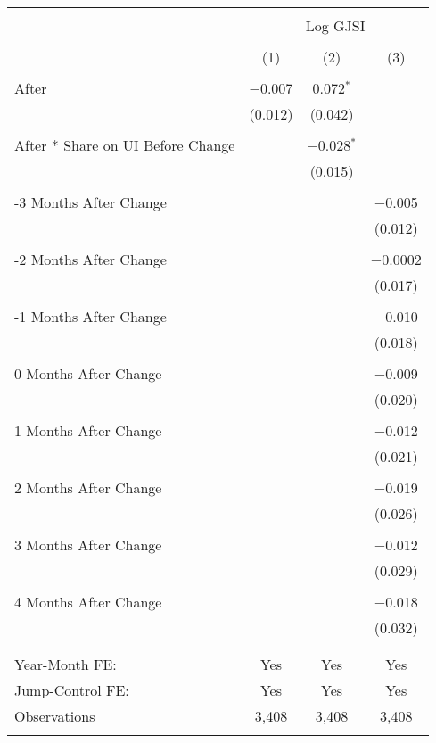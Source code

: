 
\begin{tabular}{@{\extracolsep{5pt}}lccc} 
\\[-1.8ex]\hline 
\hline \\[-1.8ex] 
 & \multicolumn{3}{c}{Log GJSI} \\ 
\cline{2-4} 
\\[-1.8ex] & (1) & (2) & (3)\\ 
\hline \\[-1.8ex] 
 After & $-$0.007 & 0.072$^{*}$ &  \\ 
  & (0.012) & (0.042) &  \\ 
  & & & \\ 
 After * Share on UI Before Change &  & $-$0.028$^{*}$ &  \\ 
  &  & (0.015) &  \\ 
  & & & \\ 
 -3 Months After Change &  &  & $-$0.005 \\ 
  &  &  & (0.012) \\ 
  & & & \\ 
 -2 Months After Change &  &  & $-$0.0002 \\ 
  &  &  & (0.017) \\ 
  & & & \\ 
 -1 Months After Change &  &  & $-$0.010 \\ 
  &  &  & (0.018) \\ 
  & & & \\ 
 0 Months After Change &  &  & $-$0.009 \\ 
  &  &  & (0.020) \\ 
  & & & \\ 
 1 Months After Change &  &  & $-$0.012 \\ 
  &  &  & (0.021) \\ 
  & & & \\ 
 2 Months After Change &  &  & $-$0.019 \\ 
  &  &  & (0.026) \\ 
  & & & \\ 
 3 Months After Change &  &  & $-$0.012 \\ 
  &  &  & (0.029) \\ 
  & & & \\ 
 4 Months After Change &  &  & $-$0.018 \\ 
  &  &  & (0.032) \\ 
  & & & \\ 
\hline \\[-1.8ex] 
Year-Month FE: & Yes & Yes & Yes \\ 
Jump-Control FE: & Yes & Yes & Yes \\ 
Observations & 3,408 & 3,408 & 3,408 \\ 
\hline 
\hline \\[-1.8ex] 
\end{tabular} 
